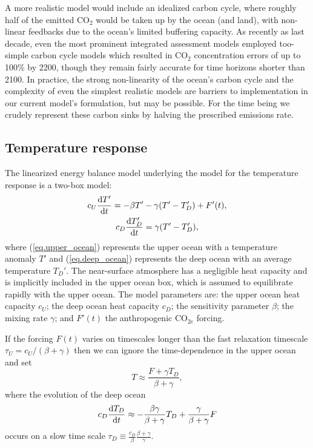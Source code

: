 \documentclass{article}
\begin{document}
A more realistic model would include an idealized carbon cycle, where roughly half of the emitted CO$_{2}$ would be taken up by the ocean (and land), with non-linear feedbacks due to the ocean's limited buffering capacity. As recently as last decade, even the most prominent integrated assessment models employed too-simple carbon cycle models which resulted in CO$_{2}$ concentration errors of up to 100\% by 2200, though they remain fairly accurate for time horizons shorter than 2100. In practice, the strong non-linearity of the ocean's carbon cycle and the complexity of even the simplest realistic models \citep[e.g.][]{Pierrehumbert_collaborator} are barriers to implementation in our current model's formulation, but may be possible. For the time being we crudely represent these carbon sinks by halving the prescribed emissions rate.

\subsection{Temperature response}
The linearized energy balance model underlying the model for the temperature response is a two-box model:
\begin{gather}
    c_{U} \dv{T'}{t} = -\beta T' - \gamma( T' - T_{D}') + F'(t), \label{eq.upper_ocean}
    \\
    c_{D} \dv{T_{D}'}{t} = \gamma (T' - T_{D}'),\label{eq.deep_ocean}
\end{gather}
where (\ref{eq.upper_ocean}) represents the upper ocean with a temperature anomaly $T'$ and (\ref{eq.deep_ocean}) represents the deep ocean with an average temperature $T_{D}'$. The near-surface atmosphere has a negligible heat capacity and is implicitly included in the upper ocean box, which is assumed to equilibrate rapidly with the upper ocean. The model parameters are: the upper ocean heat capacity $c_{U}$; the deep ocean heat capacity $c_{D}$; the sensitivity parameter $\beta$; the mixing rate $\gamma$; and $F'(t)$ the anthropogenic CO$_{2e}$ forcing.

If the forcing $F(t)$ varies on timescales longer than the fast relaxation timescale $\tau_{U} = c_{U}/(\beta + \gamma)$ then we can ignore the time-dependence in the upper ocean and set
\begin{equation}
    T \approx \frac{F+\gamma T_{D}}{\beta + \gamma},
\end{equation}
where the evolution of the deep ocean
\begin{equation}
    c_{D} \dv{T_{D}}{t} \approx - \frac{\beta \gamma}{\beta + \gamma} T_{D} + \frac{\gamma}{\beta + \gamma} F
\end{equation}
occurs on a slow time scale $\tau_{D} \equiv \frac{c_{D}}{\beta} \frac{\beta + \gamma}{\gamma}$.
\end{document}

